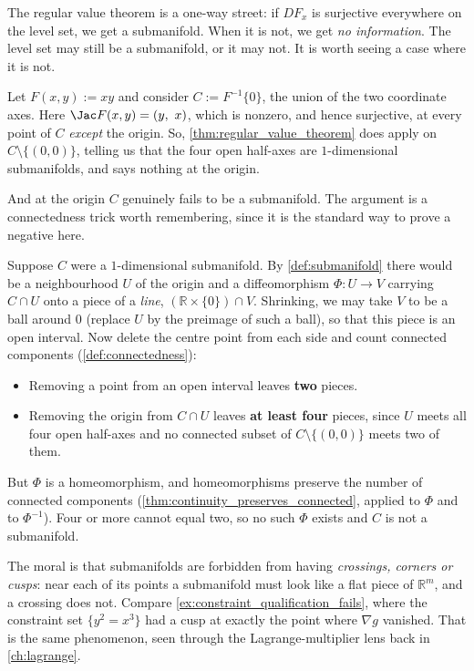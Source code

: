 \begin{aiexample}
\label{ex:cross_not_submanifold}
The regular value theorem is a one-way street: if $DF_x$ is surjective everywhere on the level
set, we get a submanifold. When it is not, we get \emph{no information}. The level set may still
be a submanifold, or it may not. It is worth seeing a case where it is not.

Let $F(x,y) := xy$ and consider $C := F^{-1}\{0\}$, the union of the two coordinate axes.
Here $\Jac F(x,y) = (y,\ x)$, which is nonzero, and hence surjective, at every point of $C$
\emph{except} the origin. So, \cref{thm:regular_value_theorem} does apply on
$C \setminus \{(0,0)\}$, telling us that the four open half-axes are $1$-dimensional
submanifolds, and says nothing at the origin.

And at the origin $C$ genuinely fails to be a submanifold. The argument is a connectedness trick
worth remembering, since it is the standard way to prove a negative here.

Suppose $C$ were a $1$-dimensional submanifold. By \cref{def:submanifold} there would be a
neighbourhood $U$ of the origin and a diffeomorphism $\Phi : U \to V$ carrying $C \cap U$ onto a
piece of a \emph{line}, $(\mathbb{R}\times\{0\})\cap V$. Shrinking, we may take $V$ to be a ball
around $0$ (replace $U$ by the preimage of such a ball), so that this piece is an open interval.
Now delete the centre point from each side and count connected components
(\cref{def:connectedness}):
\begin{itemize}
  \item Removing a point from an open interval leaves \textbf{two} pieces.
  \item Removing the origin from $C \cap U$ leaves \textbf{at least four} pieces, since $U$
    meets all four open half-axes and no connected subset of $C\setminus\{(0,0)\}$ meets two of
    them.
\end{itemize}
But $\Phi$ is a homeomorphism, and homeomorphisms preserve the number of connected components
(\cref{thm:continuity_preserves_connected}, applied to $\Phi$ and to $\Phi^{-1}$). Four or more
cannot equal two, so no such $\Phi$ exists and $C$ is not a submanifold.

\begin{remark}
The moral is that submanifolds are forbidden from having \emph{crossings, corners or cusps}: near
each of its points a submanifold must look like a flat piece of $\mathbb{R}^m$, and a crossing
does not. Compare \cref{ex:constraint_qualification_fails}, where the constraint set
$\{y^2=x^3\}$ had a cusp at exactly the point where $\nabla g$ vanished. That is the same
phenomenon, seen through the Lagrange-multiplier lens back in \cref{ch:lagrange}.
\end{remark}
\end{aiexample}

